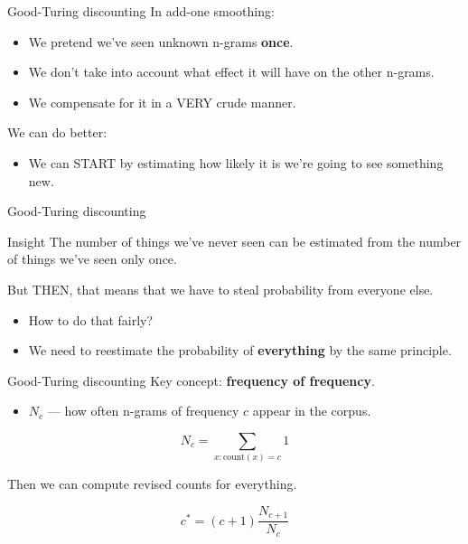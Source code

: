 \documentclass{beamer}
\begin{document}
\begin{frame}{Good-Turing discounting}
  In add-one smoothing:\pause
  \begin{itemize}
  \item We pretend we've seen unknown n-grams \textbf{once}. \pause
  \item We don't take into account what effect it will have on the 
    other n-grams.\pause
  \item We compensate for it in a VERY crude manner.\pause
  \end{itemize}
  We can do better: 
  \begin{itemize}
  \item We can START by estimating how likely it is we're going to see
    something new.
  \end{itemize}
\end{frame}


\begin{frame}{Good-Turing discounting}
  \begin{block}{Insight}
    The number of things we've never seen can be estimated from the
    number of things we've seen only once.
  \end{block} \pause
  But THEN, that means that we have to steal probability from everyone
  else.  \pause
  \begin{itemize}
  \item How to do that fairly?\pause
  \item We need to reestimate the probability of \textbf{everything} 
    by the same principle.  
  \end{itemize}
\end{frame}

\begin{frame}{Good-Turing discounting}
  Key concept: \textbf{frequency of frequency}.
  \begin{itemize}
  \item $N_c$ --- how often n-grams of frequency $c$ appear in the corpus.
  \end{itemize}\pause

  \begin{block}

    \[N_c = \sum_{x:\mathrm{count}(x)=c} 1\]
  \end{block}\pause

  Then we can compute revised counts for everything.
  \begin{block}

    \[c^* = (c+1)\frac{N_{c+1}}{N_c}\]
  \end{block}
\end{frame}
\end{document}
